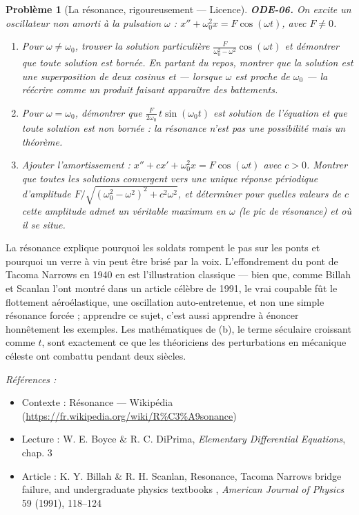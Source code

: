 \documentclass[11pt]{article}
\newtheorem{problem}{Problème}
\newenvironment{refs}{\par\small\noindent\emph{Références :}\begin{itemize}\setlength\itemsep{0pt}}{\end{itemize}\normalsize}
\begin{document}
\bigskip

\begin{problem}[{La résonance, rigoureusement --- Licence}]
\textbf{ODE-06.} On excite un oscillateur non amorti à la pulsation $ \omega $ :
$ x'' + \omega_0^2 x = F \cos(\omega t) $, avec $ F \ne 0 $.
\begin{enumerate}
\item[(a)] Pour $ \omega \ne \omega_0 $, trouver la solution particulière
$ \frac{F}{\omega_0^2 - \omega^2} \cos(\omega t) $ et démontrer que toute solution est bornée.
En partant du repos, montrer que la solution est une superposition de deux cosinus et --- lorsque
$ \omega $ est proche de $ \omega_0 $ --- la réécrire comme un produit faisant apparaître des
\textit{battements}.
\item[(b)] Pour $ \omega = \omega_0 $, démontrer que $ \frac{F}{2\omega_0}\, t \sin(\omega_0 t) $
est solution de l'équation et que \textit{toute} solution est non bornée : la résonance n'est pas
une possibilité mais un théorème.
\item[(c)] Ajouter l'amortissement : $ x'' + c x' + \omega_0^2 x = F \cos(\omega t) $ avec
$ c >0 $. Montrer que toutes les solutions convergent vers une unique réponse périodique
d'amplitude $ F / \sqrt{ (\omega_0^2 - \omega^2)^2 + c^2 \omega^2 } $, et déterminer pour
quelles valeurs de $ c $ cette amplitude admet un véritable maximum en $ \omega $ (le pic de
résonance) et où il se situe.
\end{enumerate}

\end{problem}

\noindent La résonance explique pourquoi les soldats rompent le pas sur les ponts et
pourquoi un verre à vin peut être brisé par la voix. L'effondrement du pont de Tacoma Narrows en
1940 en est l'illustration classique --- bien que, comme Billah et Scanlan l'ont montré dans un
article célèbre de 1991, le vrai coupable fût le flottement aéroélastique, une oscillation
auto-entretenue, et non une simple résonance forcée ; apprendre ce sujet, c'est aussi apprendre à
énoncer honnêtement les exemples. Les mathématiques de (b), le terme séculaire croissant comme
$ t $, sont exactement ce que les théoriciens des perturbations en mécanique céleste ont
combattu pendant deux siècles.

\begin{refs}
\item Contexte : Résonance --- Wikipédia (\url{https://fr.wikipedia.org/wiki/R%C3%A9sonance})
\item Lecture : W. E. Boyce \& R. C. DiPrima, \textit{Elementary Differential Equations}, chap. 3
\item Article : K. Y. Billah \& R. H. Scanlan, \og{} Resonance, Tacoma Narrows bridge failure, and undergraduate physics textbooks \fg{}, \textit{American Journal of Physics} 59 (1991), 118--124
\end{refs}
\end{document}
